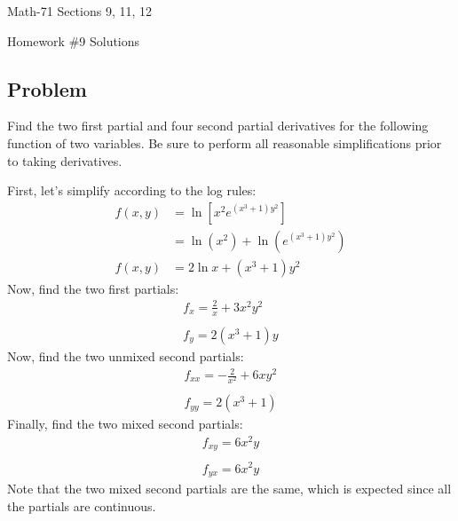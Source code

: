 \documentclass[letterpaper,12pt,fleqn]{article}
\begin{document}
\begin{center}
  \large
  Math-71 Sections 9, 11, 12

  \Large
  Homework \#9 Solutions
\end{center}

\subsection*{Problem}

Find the two first partial and four second partial derivatives for the following function of two variables.  Be sure to
perform all reasonable simplifications prior to taking derivatives.

\bigskip

\begin{quote}
  \scalebox{1.5}{\(\displaystyle f(x,y)=\ln\left[x^2e^{(x^3+1)y^2}\right]\)}
\end{quote}

First, let's simplify according to the log rules:
\begin{align*}
  f(x,y) &= \ln\left[x^2e^{(x^3+1)y^2}\right] \\
  &= \ln(x^2)+\ln(e^{(x^3+1)y^2}) \\
  f(x,y) &= 2\ln x+(x^3+1)y^2
\end{align*}
Now, find the two first partials:
\begin{gather*}
  f_x=\frac{2}{x}+3x^2y^2 \\
  \\
  f_y=2(x^3+1)y
\end{gather*}
Now, find the two unmixed second partials:
\begin{gather*}
  f_{xx}= -\frac{2}{x^2}+6xy^2 \\
  \\
  f_{yy}=2(x^3+1)
\end{gather*}
Finally, find the two mixed second partials:
\begin{gather*}
  f_{xy}= 6x^2y \\
  \\
  f_{yx}=6x^2y
\end{gather*}
Note that the two mixed second partials are the same, which is expected since all the partials are continuous.
\end{document}
